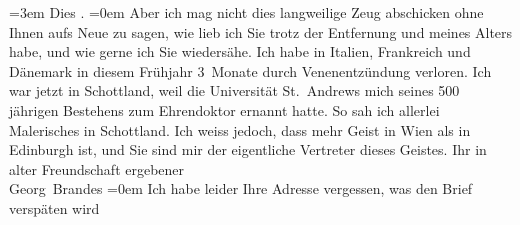 \begin{ledgroupsized}[t]{13cm}
           \leftskip=3em{}\pstart
           \noindent{}Dies \label{K_L02033-2v}\label{K_L02033-2h}.\pend
           \leftskip=0em{}\pstart
           \noindent{}Aber ich mag nicht dies langweilige Zeug abschicken ohne Ihnen aufs Neue zu sagen,
               wie lieb ich Sie trotz der Entfernung und meines Alters habe, und wie gerne ich Sie
               wiedersähe.\pend
           \pstart
           Ich habe in Italien, Frankreich und Dänemark in
               diesem Frühjahr 3 Monate durch Venenentzündung verloren. Ich war jetzt in {\pb}Schottland, weil die Universität St. Andrews mich \label{K_L02033-3v}\label{K_L02033-3h} seines 500 jährigen Bestehens zum Ehrendoktor
               ernannt hatte. So sah ich allerlei Malerisches in Schottland.\pend
           \pstart
           Ich weiss jedoch, dass mehr Geist in Wien als in
                  Edinburgh ist, und Sie sind mir der
               eigentliche Vertreter dieses Geistes.\pend
           \pstart
           Ihr in alter Freundschaft ergebener{\\[\baselineskip]}\spacefill\mbox{Georg Brandes}\pend
           \leftskip=0em{}\pstart
           \noindent{}Ich habe leider Ihre Adresse vergessen, was den Brief verspäten wird\pend
           
         
         \endnumbering{}\end{ledgroupsized}  \newcommand{\dateiname}{L02033}\newcommand{\titel}{Georg Brandes an Arthur Schnitzler, 6. 10. 1911}\newcommand{\editorInnen}{Martin Anton Müller und Gerd-Hermann Susen}
      